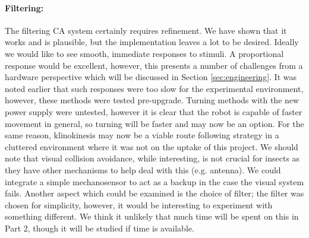 \documentclass[a4paper,11pt,twoside,openright]{article}
\begin{document}
\paragraph{Filtering:}
The filtering CA system certainly requires refinement. We have shown that it works and is plausible, but
the implementation leaves a lot to be desired. Ideally we would like to see smooth, immediate responses
to stimuli. A proportional response would be excellent, however, this presents a number of challenges
from a hardware perspective which will be discussed in Section \ref{sec:engineering}. It was noted earlier
that such responses were too slow for the experimental environment, however, these methods were tested
pre-upgrade. Turning methods with the new power supply were untested, however it is clear that the robot
is capable of faster movement in general, so turning will be faster and may now be an option. For the
same reason, klinokinesis may now be a viable route following strategy in a cluttered environment where
it was not on the uptake of this project. We should note that visual collision avoidance, while interesting,
is not crucial for insects as they have other mechanisms to help deal with this (e.g. antenna). We could
integrate a simple mechanosensor to act as a backup in the case the visual system fails. Another aspect
which could be examined is the choice of filter; the filter was chosen for simplicity, however, it
would be interesting to experiment with something different. We think it unlikely that much time
will be spent on this in Part 2, though it will be studied if time is available.
\newline
\end{document}
